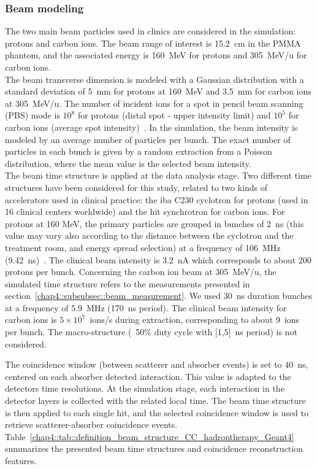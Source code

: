 \subsubsection{Beam modeling}\label{chap4::subsubsec::beam_modeling}
The two main beam particles used in clinics are considered in the simulation: protons and carbon ions. The beam range of interest is 15.2~cm in the PMMA phantom, and the associated energy is 160~MeV for protons and 305~MeV/u for carbon ions.\\ 
The beam transverse dimension is modeled with a Gaussian distribution with a standard deviation of 5~mm for protons at 160~MeV and 3.5~mm for carbon ions at 305~MeV/u. The number of incident ions for a spot in pencil beam scanning (PBS) mode is $10^8$ for protons (distal spot - upper intensity limit) and $10^5$ for carbon ions (average spot intensity)~\parencite{Kramer2000, Grevillot2011, Smeets2012}. In the simulation, the beam intensity is modeled by an average number of particles per bunch. The exact number of particles in each bunch is given by a random extraction from a Poisson distribution, where the mean value is the selected beam intensity.\\
The beam time structure is applied at the data analysis stage. Two different time structures have been considered for this study, related to two kinds of accelerators used in clinical practice: the \gls{iba} C230 cyclotron for protons (used in 16 clinical centers worldwide) and the \gls{hit} synchrotron for carbon ions. For protons at 160 MeV, the primary particles are grouped in bunches of 2~ns (this value may vary also according to the distance between the cyclotron and the treatment room, and energy spread selection) at a frequency of 106~MHz (9.42~ns)~\parencite{Roellinghoff2014}. The clinical beam intensity is 3.2~nA which corresponds to about 200 protons per bunch. Concerning the carbon ion beam at 305~MeV/u, the simulated time structure refers to the measurements presented in section~\ref{chap4::subsubsec::beam_measurement}. We used 30~ns duration bunches at a frequency of 5.9~MHz (170~ns period). The clinical beam intensity for carbon ions is $5\times10^7$~ions/s during extraction, corresponding to about 9~ions per bunch. The macro-structure (~50\% duty cycle with [1,5]~ns period) is not considered. 

The coincidence window (between scatterer and absorber events) is set to 40~ns, centered on each absorber detected interaction. This value is adapted to the detectors time resolutions. At the simulation stage, each interaction in the detector layers is collected with the related local time. The beam time structure is then applied to each single hit, and the selected coincidence window is used to retrieve scatterer-absorber coincidence events.\\ 
Table~\ref{chap4::tab::definition_beam_structure_CC_hadrontherapy_Geant4} summarizes the presented beam time structures and coincidence reconstruction features.

